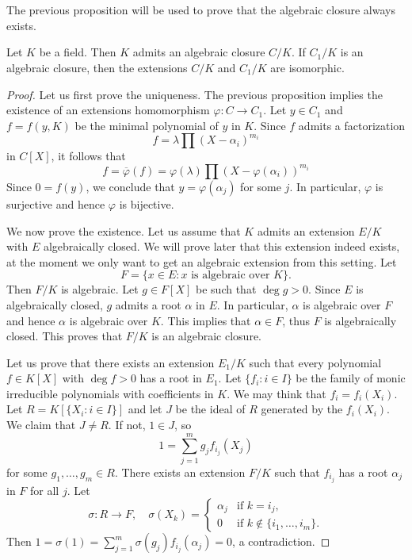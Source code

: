 \chapter{}

The previous proposition will be used to prove 
that the algebraic closure always exists. 

\begin{theorem}[Artin]
	Let $K$ be a field. Then $K$ admits an algebraic closure $C/K$. If $C_1/K$
	is an algebraic closure, then the extensions $C/K$ and $C_1/K$ are
	isomorphic. 
\end{theorem}

\begin{proof}
    Let us first prove the uniqueness. The previous proposition implies the existence of 
    an extensions homomorphism $\varphi\colon C\to C_1$. Let $y\in C_1$ and $f=f(y,K)$ be 
    the minimal polynomial of $y$ in $K$. Since $f$ admits a factorization
    \[
        f=\lambda\prod (X-\alpha_i)^{m_i}
    \]
    in $C[X]$, it follows that
    \[
    f=\overline{\varphi}(f)=\varphi(\lambda)\prod (X-\varphi(\alpha_i))^{m_i}
    \]
    Since $0=f(y)$, we conclude that $y=\varphi(\alpha_j)$ for some $j$. In particular, $\varphi$ is
    surjective and hence $\varphi$ is bijective. 
    
    We now prove the existence. Let us assume that $K$ admits an extension $E/K$ 
    with $E$ algebraically closed. We will prove later that this extension indeed exists, at the moment
    we only want to get an algebraic extension from this setting. Let 
    \[
    	F=\{x\in E:x\text{ is algebraic over }K\}. 
    \]
    Then $F/K$ is algebraic. Let $g\in F[X]$ be such that
    $\deg g>0$. Since $E$ is algebraically closed, $g$ admits a root $\alpha$ in $E$. In particular, $\alpha$
    is algebraic over $F$ and hence $\alpha$ is algebraic over $K$. This implies that $\alpha\in F$, thus
    $F$ is algebraically closed. This proves that $F/K$ is an algebraic closure. 
    
    Let us prove that there exists an extension $E_1/K$ such that
    every polynomial $f\in K[X]$ with $\deg f>0$ has a root in $E_1$. Let 
    $\{f_i:i\in I\}$ be the family of monic irreducible polynomials with coefficients in $K$. 
    We may think that $f_i=f_i(X_i)$. 
    Let $R=K[\{X_i:i\in I\}]$ and let $J$ be the ideal of $R$ 
    generated by the $f_i(X_i)$. We claim that $J\ne R$. If not, $1\in J$, so
    \[
    1=\sum_{j=1}^m g_jf_{i_j}(X_j)
    \]
    for some $g_1,\dots,g_m\in R$. There exists an extension $F/K$ such that
    $f_{i_j}$ has a root $\alpha_j$ in $F$ for all $j$. Let 
    \[
    \sigma\colon R\to F,\quad
    \sigma(X_k)=\begin{cases}
        \alpha_j & \text{if $k=i_j$},\\
        0 & \text{if $k\not\in\{i_1,\dots,i_m\}$}.
        \end{cases}
    \]
    Then $1=\sigma(1)=\sum_{j=1}^m\sigma(g_j)f_{i_j}(\alpha_j)=0$, a contradiction. 
    

\end{proof}
